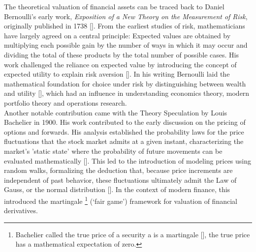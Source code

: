 \noindent
    The theoretical valuation of financial assets can be traced back to Daniel Bernoulli’s early work, \textit{Exposition of a New Theory on the Measurement of Risk}, originally published in 1738 [\cite{bernoulli2011exposition}]. From the earliest studies of risk, mathematicians have largely agreed on a central principle: Expected values are obtained by multiplying each possible gain by the number of ways in which it may occur and dividing the total of these products by the total number of possible cases. His work challenged the reliance on expected value by introducing the concept of expected utility to explain risk aversion [\cite{dimson1999three}]. In his writing Bernoulli laid the mathematical foundation for choice under risk by distinguishing between wealth and utility [\cite{stearns2000daniel}], which had an influence in understanding economics theory, modern portfolio theory and operations research.\\ 

    \noindent
    Another notable contribution came with the Theory Speculation by Louis Bachelier in 1900. His work contributed to the early discussion on the pricing of options and forwards.  His analysis established the probability laws for the price fluctuations that the stock market admits at a given instant, characterizing the market’s 'static state' where the probability of future movements can be evaluated mathematically [\cite{davis2006louis}]. This led to the introduction of modeling prices using random walks, formalizing the deduction that, because price increments are independent of past behavior, these fluctuations ultimately admit the Law of Gauss, or the normal distribution [\cite{Bachelier2007}]. In the context of modern finance, this introduced the martingale \footnote{Bachelier called the true price of a security a is a martingale [\cite{davis2006louis}], the true price has a mathematical expectation of zero.} (‘fair game’) framework for valuation of financial derivatives. \\



